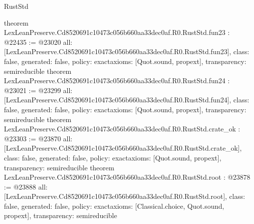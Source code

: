 \begin{lexlean}{RustStd}
\begin{coremodule}
{}
theorem LexLeanPreserve.Cd8520691c10473c056b660aa33dec0af.R0.RustStd.fun23 : @22435 := @23020 {
  all: [LexLeanPreserve.Cd8520691c10473c056b660aa33dec0af.R0.RustStd.fun23],
  class: false,
  generated: false,
  policy: exact{axioms: [Quot.sound, propext]},
  transparency: semireducible
}
theorem LexLeanPreserve.Cd8520691c10473c056b660aa33dec0af.R0.RustStd.fun24 : @23021 := @23299 {
  all: [LexLeanPreserve.Cd8520691c10473c056b660aa33dec0af.R0.RustStd.fun24],
  class: false,
  generated: false,
  policy: exact{axioms: [Quot.sound, propext]},
  transparency: semireducible
}
theorem LexLeanPreserve.Cd8520691c10473c056b660aa33dec0af.R0.RustStd.crate_ok : @23303 := @23870 {
  all: [LexLeanPreserve.Cd8520691c10473c056b660aa33dec0af.R0.RustStd.crate_ok],
  class: false,
  generated: false,
  policy: exact{axioms: [Quot.sound, propext]},
  transparency: semireducible
}
theorem LexLeanPreserve.Cd8520691c10473c056b660aa33dec0af.R0.RustStd.root : @23878 := @23888 {
  all: [LexLeanPreserve.Cd8520691c10473c056b660aa33dec0af.R0.RustStd.root],
  class: false,
  generated: false,
  policy: exact{axioms: [Classical.choice, Quot.sound, propext]},
  transparency: semireducible
}


\end{coremodule}
\end{lexlean}
